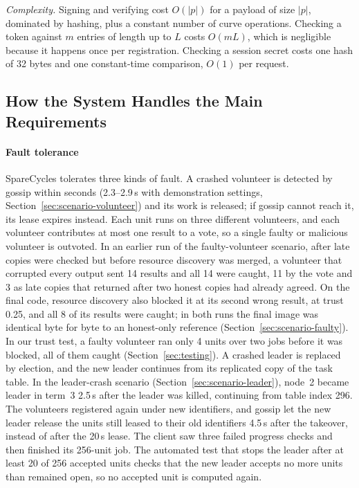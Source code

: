 \emph{Complexity.} Signing and verifying cost $O(|p|)$ for a payload of size $|p|$, dominated by hashing, plus a constant number of curve operations. Checking a token against $m$ entries of length up to $L$ costs $O(mL)$, which is negligible because it happens once per registration. Checking a session secret costs one hash of 32 bytes and one constant-time comparison, $O(1)$ per request.

\subsection{How the System Handles the Main Requirements}

\paragraph{Fault tolerance}
SpareCycles tolerates three kinds of fault. A crashed volunteer is detected by gossip within seconds (2.3--2.9\,s with demonstration settings, Section~\ref{sec:scenario-volunteer}) and its work is released; if gossip cannot reach it, its lease expires instead. Each unit runs on three different volunteers, and each volunteer contributes at most one result to a vote, so a single faulty or malicious volunteer is outvoted. In an earlier run of the faulty-volunteer scenario, after late copies were checked but before resource discovery was merged, a volunteer that corrupted every output sent 14 results and all 14 were caught, 11 by the vote and 3 as late copies that returned after two honest copies had already agreed. On the final code, resource discovery also blocked it at its second wrong result, at trust 0.25, and all 8 of its results were caught; in both runs the final image was identical byte for byte to an honest-only reference (Section~\ref{sec:scenario-faulty}). In our trust test, a faulty volunteer ran only 4 units over two jobs before it was blocked, all of them caught (Section~\ref{sec:testing}). A crashed leader is replaced by election, and the new leader continues from its replicated copy of the task table. In the leader-crash scenario (Section~\ref{sec:scenario-leader}), node~2 became leader in term~3 2.5\,s after the leader was killed, continuing from table index 296. The volunteers registered again under new identifiers, and gossip let the new leader release the units still leased to their old identifiers 4.5\,s after the takeover, instead of after the 20\,s lease. The client saw three failed progress checks and then finished its 256-unit job. The automated test that stops the leader after at least 20 of 256 accepted units checks that the new leader accepts no more units than remained open, so no accepted unit is computed again.

